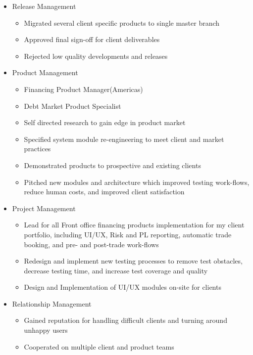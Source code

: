 \documentclass[11pt,letterpaper,roman]{moderncv}
\begin{document}
\begin{itemize}
    \item Release Management
        \begin{itemize}
           \item Migrated several client specific products to single master branch
           \item Approved final sign-off for client deliverables
           \item Rejected low quality developments and releases
        \end{itemize}
    \item Product Management
        \begin{itemize}
           \item Financing Product Manager(Americas)
           \item Debt Market Product Specialist
           \item Self directed research to gain edge in product market
           \item Specified system module re-engineering to meet client and market practices
           \item Demonstrated products to prospective and existing clients
           \item Pitched new modules and architecture which improved testing work-flows, reduce human costs, and improved client satisfaction
        \end{itemize}
    \item Project Management
        \begin{itemize}
           \item Lead for all Front office financing products implementation for my client portfolio, including UI/UX, Risk and PL reporting, automatic trade booking, and pre- and post-trade work-flows
           \item Redesign and implement new testing processes to remove test obstacles, decrease testing time, and increase test coverage and quality
           \item Design and Implementation of UI/UX modules on-site for clients
        \end{itemize}
    \item Relationship Management
        \begin{itemize}
           \item Gained reputation for handling difficult clients and turning around unhappy users
           \item Cooperated on multiple client and product teams

\end{itemize}
\end{itemize}
\end{document}
